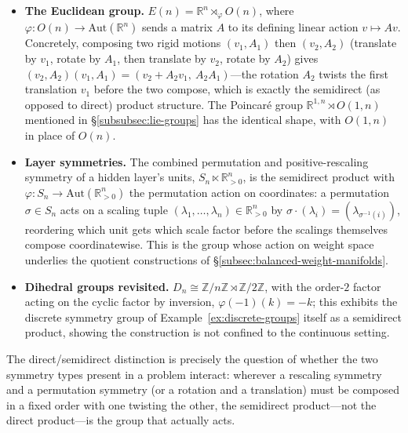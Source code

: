 \documentclass[mathematics,review,submit,moreauthors]{Definitions/mdpi}
\begin{document}
\begin{Example}\label{ex:semidirect-products}
\phantom{u}
\begin{itemize}
    \item \textbf{The Euclidean group.} $E(n) = \mathbb{R}^n \rtimes_\varphi
    O(n)$, where $\varphi : O(n) \to \mathrm{Aut}(\mathbb{R}^n)$ sends a
    matrix $A$ to its defining linear action $v \mapsto Av$. Concretely,
    composing two rigid motions $(v_1, A_1)$ then $(v_2,A_2)$ (translate by
    $v_1$, rotate by $A_1$, then translate by $v_2$, rotate by $A_2$) gives
    $(v_2, A_2)(v_1,A_1) = (v_2 + A_2 v_1,\ A_2 A_1)$---the rotation
    $A_2$ twists the first translation $v_1$ before the two compose, which
    is exactly the semidirect (as opposed to direct) product structure. The
    Poincar\'e group $\mathbb{R}^{1,n} \rtimes O(1,n)$ mentioned in
    \S\ref{subsubsec:lie-groups} has the identical shape, with $O(1,n)$ in
    place of $O(n)$.
    \item \textbf{Layer symmetries.} The combined permutation and
    positive-rescaling symmetry of a hidden layer's units,
    $S_n \ltimes \mathbb{R}_{>0}^n$, is the semidirect product with
    $\varphi : S_n \to \mathrm{Aut}(\mathbb{R}_{>0}^n)$ the permutation
    action on coordinates: a permutation $\sigma \in S_n$ acts on a scaling
    tuple $(\lambda_1,\dots,\lambda_n) \in \mathbb{R}_{>0}^n$ by
    $\sigma \cdot (\lambda_i) = (\lambda_{\sigma^{-1}(i)})$, reordering which
    unit gets which scale factor before the scalings themselves compose
    coordinatewise. This is the group whose action on weight space underlies
    the quotient constructions of
    \S\ref{subsec:balanced-weight-manifolds}.
    \item \textbf{Dihedral groups revisited.} $D_n \cong \mathbb{Z}/n\mathbb{Z}
    \rtimes \mathbb{Z}/2\mathbb{Z}$, with the order-$2$ factor acting on the
    cyclic factor by inversion, $\varphi(-1)(k) = -k$; this exhibits the
    discrete symmetry group of Example~\ref{ex:discrete-groups} itself as a
    semidirect product, showing the construction is not confined to the
    continuous setting.
\end{itemize}
\end{Example}

The direct/semidirect distinction is precisely the question of whether the
two symmetry types present in a problem interact: wherever a rescaling
symmetry and a permutation symmetry (or a rotation and a translation) must be
composed in a fixed order with one twisting the other, the semidirect
product---not the direct product---is the group that actually acts.
\end{document}
